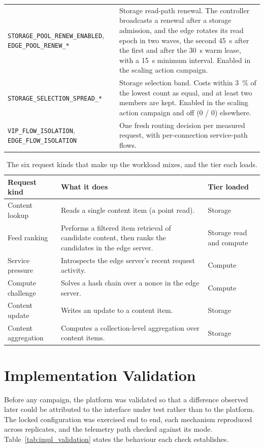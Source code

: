 ﻿\documentclass[12pt,reqno,twoside]{amsbook}
\begin{document}
{\begin{table}[H]
\begin{tabular}{p{} p{}}
        \texttt{STORAGE\_POOL\_RENEW\_ENABLED}, \texttt{EDGE\_POOL\_RENEW\_*} & Storage read-path renewal. The controller broadcasts a renewal after a storage admission, and the edge rotates its read epoch in two waves, the second 45~s after the first and after the 30~s warm lease, with a 15~s minimum interval. Enabled in the scaling action campaign. \\
        \texttt{STORAGE\_SELECTION\_SPREAD\_*} & Storage selection band. Costs within 3~\% of the lowest count as equal, and at least two members are kept. Enabled in the scaling action campaign and off (0 / 0) elsewhere. \\
        \texttt{VIP\_FLOW\_ISOLATION}, \texttt{EDGE\_FLOW\_ISOLATION} & One fresh routing decision per measured request, with per-connection service-path flows. \\
        \bottomrule
    \end{tabular}
\end{table}

\begin{table}[H]
    \centering
    \caption{The six request kinds that make up the workload mixes, and
    the tier each loads.}
    \label{tab:request_kinds}
    \footnotesize
    \begin{tabular}{p{} p{} p{}}
        \toprule
        Request kind & What it does & Tier loaded \\
        \midrule
        Content lookup & Reads a single content item (a point read). & Storage \\
        Feed ranking & Performs a filtered item retrieval of candidate
        content, then ranks the candidates in the edge server. & Storage read
        and compute \\
        Service pressure & Introspects the edge server's recent request
        activity. & Compute \\
        Compute challenge & Solves a hash chain over a nonce in the edge
        server. & Compute \\
        Content update & Writes an update to a content item. & Storage \\
        Content aggregation & Computes a collection-level aggregation over
        content items. & Storage \\
        \bottomrule
    \end{tabular}
\end{table}

\chapter{Implementation Validation}\label{app:impl_validation}
Before any campaign, the platform was validated so that a difference observed
later could be attributed to the interface under test rather than to the
platform. The locked configuration was exercised end to end, each mechanism
reproduced across replicates, and the telemetry path checked against its mode.
Table~\ref{tab:impl_validation} states the behaviour each check establishes.

}
\end{document}
